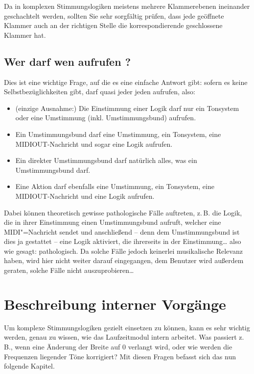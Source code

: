 Da in komplexen Stimmungslogiken meistens mehrere Klammerebenen
ineinander geschachtelt werden, sollten Sie sehr sorgfältig prüfen, dass
jede geöffnete Klammer auch an der richtigen Stelle die
korrespondierende geschlossene Klammer hat.

\section{Wer darf wen aufrufen ?}\label{sec:wer-darf-wen}
Dies ist eine wichtige Frage, auf die es eine einfache Antwort gibt:
sofern es keine Selbstbezüglichkeiten gibt, darf quasi jeder jeden
aufrufen, also:
\begin{itemize}
\item (einzige Ausnahme:) Die Einstimmung einer Logik darf nur ein
  Tonsystem oder eine Umstimmung (inkl. Um\-stim\-mungs\-bund)
  aufrufen.
\item Ein Umstimmungsbund darf eine Umstimmung, ein Tonsystem, eine
  MIDIOUT-Nachricht und sogar eine Logik aufrufen.
\item Ein direkter Umstimmungsbund darf natürlich alles, was ein
  Umstimmungsbund darf.
\item Eine Aktion darf ebenfalls eine Umstimmung, ein Tonsystem, eine
  MIDIOUT-Nachricht und eine Logik aufrufen.
\end{itemize}
Dabei können theoretisch gewisse pathologische Fälle auftreten, z.\,B.
die Logik, die in ihrer Einstimmung einen Umstimmungsbund aufruft,
welcher eine MIDI"=Nachricht sendet und anschließend -- denn dem
Umstimmungsbund ist dies ja gestattet -- eine Logik aktiviert, die
ihrerseits in der Einstimmung\dots{} \hspace{1cm} also wie gesagt:
pathologisch. Da solche Fälle jedoch keinerlei musikalische Relevanz
haben, wird hier nicht weiter darauf eingegangen, dem Benutzer wird
außerdem geraten, solche Fälle nicht auszuprobieren\dots

\chapter{Beschreibung interner Vorgänge}\label{cha:beschr-intern-vorg}
Um komplexe Stimmungslogiken gezielt einsetzen zu können, kann es sehr
wichtig werden, genau zu wissen, wie das Laufzeitmodul intern
arbeitet. Was passiert z.\,B., wenn eine Änderung der Breite auf 0
verlangt wird, oder wie werden die Frequenzen liegender Töne
korrigiert? Mit diesen Fragen befasst sich das nun folgende Kapitel.

